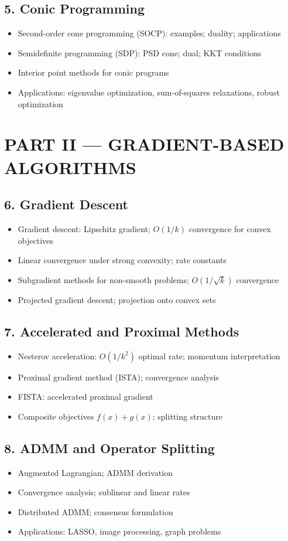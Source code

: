 \subsection{5. Conic Programming}
\begin{itemize}
\item Second-order cone programming (SOCP): examples; duality; applications
\item Semidefinite programming (SDP): PSD cone; dual; KKT conditions
\item Interior point methods for conic programs
\item Applications: eigenvalue optimization, sum-of-squares relaxations, robust optimization
\end{itemize}

\section{PART II --- GRADIENT-BASED ALGORITHMS}

\subsection{6. Gradient Descent}
\begin{itemize}
\item Gradient descent: Lipschitz gradient; $O(1/k)$ convergence for convex objectives
\item Linear convergence under strong convexity; rate constants
\item Subgradient methods for non-smooth problems; $O(1/\sqrt{k})$ convergence
\item Projected gradient descent; projection onto convex sets
\end{itemize}

\subsection{7. Accelerated and Proximal Methods}
\begin{itemize}
\item Nesterov acceleration: $O(1/k^2)$ optimal rate; momentum interpretation
\item Proximal gradient method (ISTA); convergence analysis
\item FISTA: accelerated proximal gradient
\item Composite objectives $f(x)+g(x)$; splitting structure
\end{itemize}

\subsection{8. ADMM and Operator Splitting}
\begin{itemize}
\item Augmented Lagrangian; ADMM derivation
\item Convergence analysis; sublinear and linear rates
\item Distributed ADMM; consensus formulation
\item Applications: LASSO, image processing, graph problems
\end{itemize}

